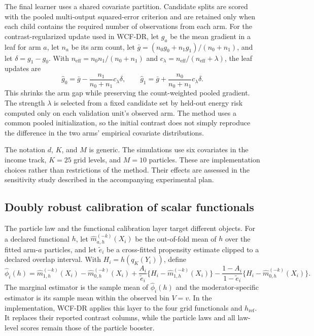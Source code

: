 The final learner uses a shared covariate partition. Candidate splits are
scored with the pooled multi-output squared-error criterion and are retained
only when each child contains the required number of observations from each
arm. For the contrast-regularized update used in WCF-DR, let $g_a$ be the
mean gradient in a leaf for arm $a$, let $n_a$ be its arm count, let
$\bar g=(n_0g_0+n_1g_1)/(n_0+n_1)$, and let $\delta=g_1-g_0$. With
$n_{\mathrm{eff}}=n_0n_1/(n_0+n_1)$ and
$c_\lambda=n_{\mathrm{eff}}/(n_{\mathrm{eff}}+\lambda)$, the leaf updates are
\[
 \widehat g_0=\bar g-\frac{n_1}{n_0+n_1}c_\lambda\delta,
 \qquad
 \widehat g_1=\bar g+\frac{n_0}{n_0+n_1}c_\lambda\delta.
\]
This shrinks the arm gap while preserving the count-weighted pooled gradient.
The strength $\lambda$ is selected from a fixed candidate set by held-out
energy risk computed only on each validation unit's observed arm. The method
uses a common pooled initialization, so the initial contrast does not simply
reproduce the difference in the two arms' empirical covariate distributions.

The notation $d$, $K$, and $M$ is generic. The simulations use six covariates
in the income track, $K=25$ grid levels, and $M=10$ particles. These are
implementation choices rather than restrictions of the method. Their effects
are assessed in the sensitivity study described in the accompanying
experimental plan.

\subsection{Doubly robust calibration of scalar functionals}\label{sec:dr}

The particle law and the functional calibration layer target different
objects. For a declared functional $h$, let $\widehat m_{a,h}^{(-k)}(X_i)$
be the out-of-fold mean of $h$ over the fitted arm-$a$ particles, and let
$\widetilde e_i$ be a cross-fitted propensity estimate clipped to a declared
overlap interval. With $H_i=h(q_K(Y_i))$, define
\[
 \widehat\phi_i(h)=\widehat m_{1,h}^{(-k)}(X_i)
 -\widehat m_{0,h}^{(-k)}(X_i)
 +\frac{A_i}{\widetilde e_i}
   \{H_i-\widehat m_{1,h}^{(-k)}(X_i)\}
 -\frac{1-A_i}{1-\widetilde e_i}
   \{H_i-\widehat m_{0,h}^{(-k)}(X_i)\}.
\]
The marginal estimator is the sample mean of $\widehat\phi_i(h)$ and the
moderator-specific estimator is its sample mean within the observed bin
$V=v$. In the implementation, WCF-DR applies this layer to the four grid
functionals and $h_{\mathrm{ref}}$. It replaces their reported contrast
columns, while the particle laws and all law-level scores remain those of the
particle booster.

